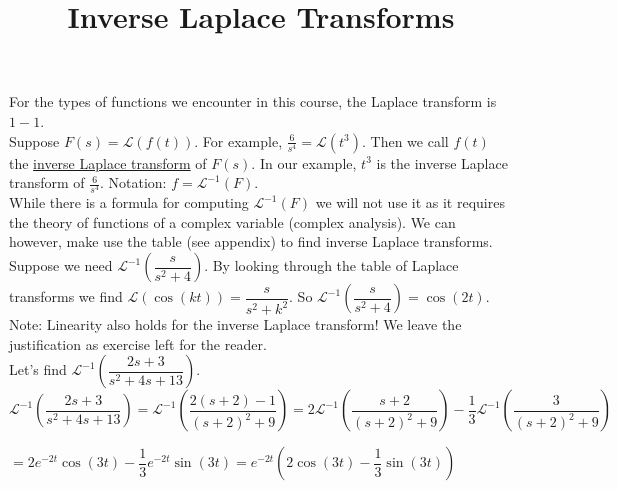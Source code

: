 \documentclass{ximera}
\begin{document}
\begin{abstract}
 \end{abstract}

    \title{Inverse Laplace Transforms}
    
\maketitle

 For the types of functions we encounter in this course, the Laplace transform is $1-1$.\\


 Suppose $F(s)=\mathcal{L}(f(t))$.  For example, $\frac{6}{s^4}=\mathcal{L}(t^3)$.  Then we call $f(t)$ the \underline{inverse Laplace transform} of $F(s)$.   In our example, $t^3$ is the inverse Laplace transform of $\frac{6}{s^4}$.   Notation:  $f=\mathcal{L}^{-1}(F)$.\\


 While there is a formula for computing $\mathcal{L}^{-1}(F)$ we will not use it as it requires the theory of functions of a complex variable (complex analysis).   We can however, make use the table (see appendix) to find inverse Laplace transforms.\\


 Suppose we need $\mathcal{L}^{-1}\left(\dfrac{s}{s^{2}+4}\right)$.   By looking through the table of Laplace transforms we find $\mathcal{L}(\cos{(kt)})=\dfrac{s}{s^2+k^2}$.  So $\mathcal{L}^{-1}\left(\dfrac{s}{s^{2}+4}\right)=\cos{(2t)}$.\\


 Note:  Linearity also holds for the inverse Laplace transform! We leave the justification as exercise left for the reader.\\


 Let's find $\mathcal{L}^{-1}\left(\dfrac{2s+3}{s^{2}+4s+13}\right)$.\\


 $$\mathcal{L}^{-1}\left(\dfrac{2s+3}{s^{2}+4s+13}\right)=\mathcal{L}^{-1}\left(\dfrac{2(s+2)-1}{(s+2)^{2}+9}\right)=2\mathcal{L}^{-1}\left(\dfrac{s+2}{(s+2)^{2}+9}\right)-\dfrac{1}{3}\mathcal{L}^{-1}\left(\dfrac{3}{(s+2)^{2}+9}\right)$$

\medskip

 \hspace{0.5cm} $\displaystyle =2e^{-2t}\cos{(3t)}-\dfrac{1}{3}e^{-2t}\sin{(3t)}=e^{-2t}\left(2\cos{(3t)}-\dfrac{1}{3}\sin{(3t)}\right)$\\ \\
\end{document}
